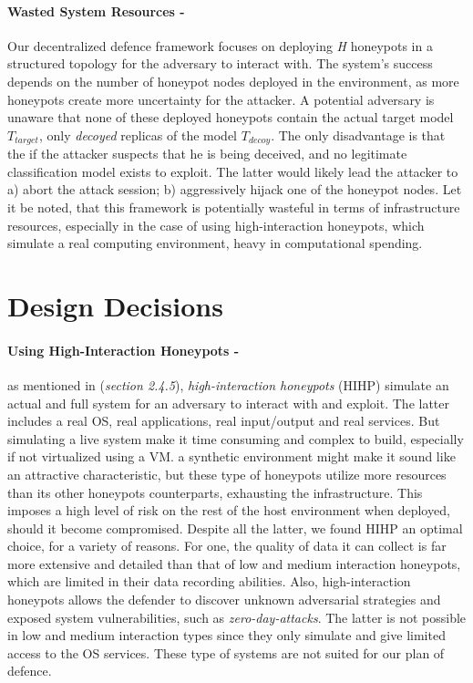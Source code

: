 \documentclass[grad,lot,lof,11pt,oneside,onehalfspace]{RUthesis}
\begin{document}
\paragraph{Wasted System Resources -}
Our decentralized defence framework focuses on deploying \textit{H} honeypots in a structured topology for the adversary to interact with. The system's success depends on the number of honeypot nodes deployed in the environment, as more honeypots create more uncertainty for the attacker. A potential adversary is unaware that none of these deployed honeypots contain the actual target model \textit{$T_{target}$}, only \textit{decoyed} replicas of the model \textit{$T_{decoy}$}. The only disadvantage is that the if the attacker suspects that he is being deceived, and no legitimate classification model exists to exploit. The latter would likely lead the attacker to a) abort the attack session; b) aggressively hijack one of the honeypot nodes. Let it be noted, that this framework is potentially wasteful in terms of infrastructure resources, especially in the case of using high-interaction honeypots, which simulate a real computing environment, heavy in computational spending. 
\section{Design Decisions}
\paragraph{Using High-Interaction Honeypots -} as mentioned in (\textit{section 2.4.5}), \textit{high-interaction honeypots} (HIHP) simulate an actual and full system for an adversary to interact with and exploit. The latter includes a real OS, real applications, real input/output and real services. But simulating a live system make it time consuming and complex to build, especially if not virtualized using a VM. a synthetic environment might make it sound like an attractive characteristic, but these type of honeypots utilize more resources than its other honeypots counterparts, exhausting the infrastructure. This imposes a high level of risk on the rest of the host environment when deployed, should it become compromised. Despite all the latter, we found HIHP an optimal choice, for a variety of reasons. For one, the quality of data it can collect is far more extensive and detailed than that of low and medium interaction honeypots, which are limited in their data recording abilities. Also, high-interaction honeypots allows the defender to discover unknown adversarial strategies and exposed system vulnerabilities, such as \textit{zero-day-attacks}. The latter is not possible in low and medium interaction types since they only simulate and give limited access to the OS services. These type of systems are not suited for our plan of defence.
\end{document}
